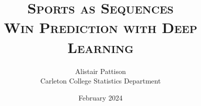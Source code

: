 \documentclass[titlepage]{article}
\title{\scshape
	Sports as Sequences \\[1em]
	\large Win Prediction with Deep Learning
}
\author{Alistair Pattison \\ {\small Carleton College Statistics Department}}
\date{February 2024}
\begin{document}
\maketitle

\begin{abstract}
\end{abstract}

\tableofcontents
\thispagestyle{empty}

\newpage

\pagestyle{fancy}
\setcounter{page}{1}








\clearpage

\nocite{ISL, ESL}

\printbibliography
\end{document}
